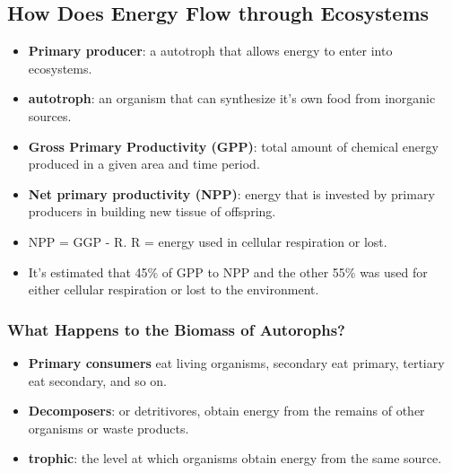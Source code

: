 \documentclass[12pt,a4paper]{article}
\begin{document}
\subsection{How Does Energy Flow through Ecosystems}
\begin{itemize}
    \item \textbf{Primary producer}: a autotroph that allows energy to enter into ecosystems.
    \item \textbf{autotroph}: an organism that can synthesize it's own food from inorganic sources.
    \item \textbf{Gross Primary Productivity (GPP)}: total amount of chemical energy produced in a given area and time period.
    \item \textbf{Net primary productivity (NPP)}: energy that is invested by primary producers in building new tissue of offspring.
    \item NPP = GGP - R. R = energy used in cellular respiration or lost.
    \item It's estimated that 45\% of GPP to NPP and the other 55\% was used for either cellular respiration or lost to the environment.
\end{itemize}
    \subsubsection{What Happens to the Biomass of Autorophs?}
    \begin{itemize}
        \item \textbf{Primary consumers} eat living organisms, secondary eat primary, tertiary eat secondary, and so on.
        \item \textbf{Decomposers}: or detritivores, obtain energy from the remains of other organisms or waste products. 
        \item \textbf{trophic}: the level at which organisms obtain energy from the same source.
    \end{itemize}
\end{document}
